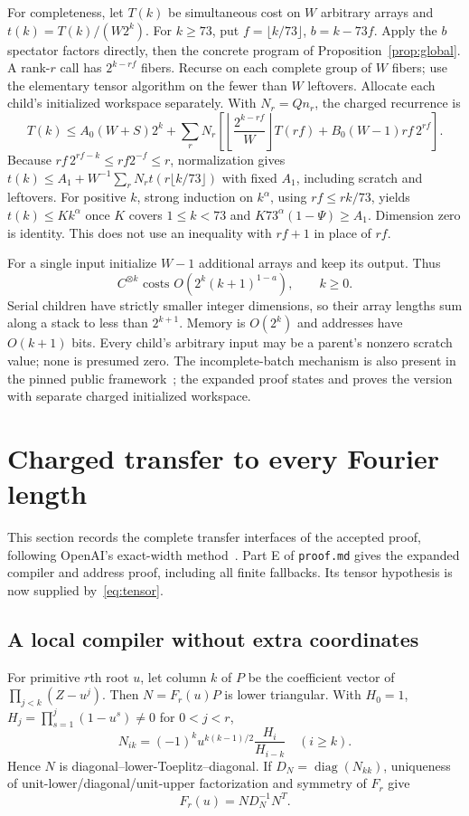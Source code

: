 \documentclass[11pt]{amsart}
\theoremstyle{remark}
\newcommand{\diag}{\operatorname{diag}}
\begin{document}
For completeness, let $T(k)$ be simultaneous cost on $W$ arbitrary
arrays and $t(k)=T(k)/(W2^k)$. For $k\ge73$, put $f=\lfloor k/73\rfloor$,
$b=k-73f$. Apply the $b$ spectator factors directly, then the concrete
program of Proposition~\ref{prop:global}. A rank-$r$ call has
$2^{k-rf}$ fibers. Recurse on each complete group of $W$ fibers;
use the elementary tensor algorithm on the fewer than $W$ leftovers.
Allocate each child's initialized workspace separately. With
$N_r=Qn_r$, the charged recurrence is
\[
 T(k)\le A_0(W+S)2^k+\sum_rN_r\left[
 \left\lfloor\frac{2^{k-rf}}W\right\rfloor T(rf)
 +B_0(W-1)rf\,2^{rf}\right].
\]
Because $rf\,2^{rf-k}\le rf2^{-f}\le r$, normalization gives
$t(k)\le A_1+W^{-1}\sum_rN_rt(r\lfloor k/73\rfloor)$ with fixed
$A_1$, including scratch and leftovers. For positive $k$, strong
induction on $k^\alpha$, using $rf\le rk/73$, yields $t(k)\le Kk^\alpha$
once $K$ covers $1\le k<73$ and $K73^\alpha(1-\Psi)\ge A_1$.
Dimension zero is identity. This does not use an inequality with
$rf+1$ in place of $rf$.

For a single input initialize $W-1$ additional arrays and keep its
output. Thus
\begin{equation}\label{eq:tensor}
 C^{\otimes k}\text{ costs }O(2^k(k+1)^{1-a}),\qquad k\ge0.
\end{equation}
Serial children have strictly smaller integer dimensions, so their
array lengths sum along a stack to less than $2^{k+1}$. Memory is
$O(2^k)$ and addresses have $O(k+1)$ bits. Every child's arbitrary
input may be a parent's nonzero scratch value; none is presumed zero.
The incomplete-batch mechanism is also present in the pinned public
framework~\cite{SheaPackage2026}; the expanded proof states and proves
the version with separate charged initialized workspace.

\section{Charged transfer to every Fourier length}
This section records the complete transfer interfaces of the accepted
proof, following OpenAI's exact-width method~\cite{OpenAIExactDFT2026}.
Part E of \texttt{proof.md} gives the expanded compiler and address
proof, including all finite fallbacks. Its tensor hypothesis is now
supplied by~\eqref{eq:tensor}.

\subsection{A local compiler without extra coordinates}
For primitive $r$th root $u$, let column $k$ of $P$ be the coefficient
vector of $\prod_{j<k}(Z-u^j)$. Then $N=F_r(u)P$ is lower triangular.
With $H_0=1$, $H_j=\prod_{s=1}^j(1-u^s)\ne0$ for $0<j<r$,
\[
 N_{ik}=(-1)^ku^{k(k-1)/2}\frac{H_i}{H_{i-k}}\quad(i\ge k).
\]
Hence $N$ is diagonal--lower-Toeplitz--diagonal. If $D_N=\diag(N_{kk})$,
uniqueness of unit-lower/diagonal/unit-upper factorization and symmetry
of $F_r$ give
\begin{equation}\label{eq:newton}
 F_r(u)=ND_N^{-1}N^T.
\end{equation}
\end{document}
